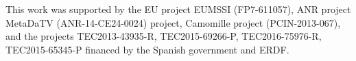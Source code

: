 \documentclass[10pt,conference,a4paper]{IEEEtran}
\begin{document}


%



%













  This work was supported by the EU project EUMSSI (FP7-611057), ANR project MetaDaTV (ANR-14-CE24-0024) project, Camomille project (PCIN-2013-067),
 and the projects TEC2013-43935-R, TEC2015-69266-P, TEC2016-75976-R, TEC2015-65345-P financed by the Spanish government and ERDF.



{\scriptsize

}

%
\end{document}
